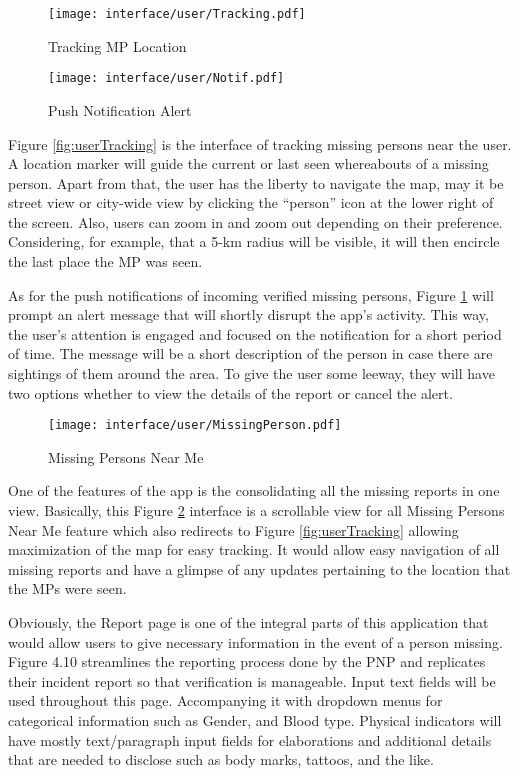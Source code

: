 \begin{figure}[!h]
    \centering
    \begin{minipage}[c]{0.50\linewidth}
        \centering
        \texttt{[image: interface/user/Tracking.pdf]}
        \caption{Tracking MP Location}
        \label{fig:userTracking}
    \end{minipage}\hfill
    \centering
    \begin{minipage}[c]{0.50\linewidth}
        \centering
        \texttt{[image: interface/user/Notif.pdf]}
        \caption{Push Notification Alert}
        \label{fig:userNotif}
    \end{minipage}
\end{figure}
Figure \ref{fig:userTracking} is the interface of tracking missing persons near the user. A location marker will guide the current or last seen whereabouts of a missing person. Apart from that, the user has the liberty to navigate the map, may it be street view or city-wide view by clicking the ``person” icon at the lower right of the screen. Also, users can zoom in and zoom out depending on their preference. Considering, for example, that a 5-km radius will be visible, it will then encircle the last place the MP was seen.

As for the push notifications of incoming verified missing persons, Figure \ref{fig:userNotif} will prompt an alert message that will shortly disrupt the app’s activity. This way, the user’s attention is engaged and focused on the notification for a short period of time. The message will be a short description of the person in case there are sightings of them around the area. To give the user some leeway, they will have two options whether to view the details of the report or cancel the alert.

\begin{figure}[!h]
    \centering
    \texttt{[image: interface/user/MissingPerson.pdf]}
    \caption{Missing Persons Near Me}
    \label{fig:userMP}
\end{figure}
One of the features of the app is the consolidating all the missing reports in one view. Basically, this Figure \ref{fig:userMP} interface is a scrollable view for all Missing Persons Near Me feature which also redirects to Figure \ref{fig:userTracking} allowing maximization of the map for easy tracking. It would allow easy navigation of all missing reports and have a glimpse of any updates pertaining to the location that the MPs were seen. 

Obviously, the Report page is one of the integral parts of this application that would allow users to give necessary information in the event of a person missing. Figure 4.10 streamlines the reporting process done by the PNP and replicates their incident report so that verification is manageable. Input text fields will be used throughout this page. Accompanying it with dropdown menus for categorical information such as Gender, and Blood type. Physical indicators will have mostly text/paragraph input fields for elaborations and additional details that are needed to disclose such as body marks, tattoos, and the like.


